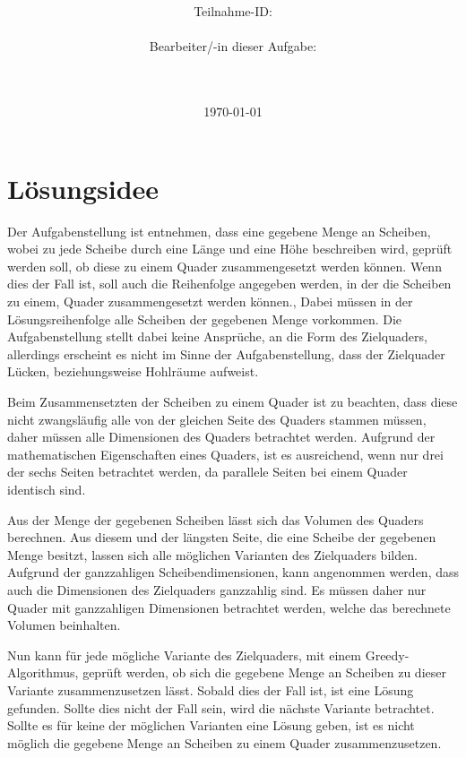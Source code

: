 \documentclass[a4paper,10pt,ngerman]{scrartcl}
\title{\textbf{\Huge\Aufgabe}}
\author{\LARGE Teilnahme-ID: \LARGE \TeilnahmeId \\\\
\LARGE Bearbeiter/-in dieser Aufgabe: \\
\LARGE \Name\\\\}
\date{\LARGE\today}
\begin{document}
    \maketitle
    \tableofcontents
    \vspace{0.5cm}

    \newpage
    \section{Lösungsidee}\label{sec:losungsidee}

    Der Aufgabenstellung ist entnehmen, dass eine gegebene Menge an Scheiben, wobei zu jede Scheibe durch
    eine Länge und eine Höhe beschreiben wird, geprüft werden soll, ob diese zu einem Quader zusammengesetzt werden können.
    Wenn dies der Fall ist, soll auch die Reihenfolge angegeben werden, in der die Scheiben zu einem, Quader zusammengesetzt werden können.,
    Dabei müssen in der Lösungsreihenfolge alle Scheiben der gegebenen Menge vorkommen.
    Die Aufgabenstellung stellt dabei keine Ansprüche, an die Form des Zielquaders, allerdings erscheint es nicht im Sinne der Aufgabenstellung,
    dass der Zielquader Lücken, beziehungsweise Hohlräume aufweist.

    Beim Zusammensetzten der Scheiben zu einem Quader ist zu beachten, dass diese nicht zwangsläufig alle von der gleichen Seite des Quaders stammen müssen,
    daher müssen alle Dimensionen des Quaders betrachtet werden.
    Aufgrund der mathematischen Eigenschaften eines Quaders, ist es ausreichend, wenn nur drei der sechs Seiten betrachtet werden,
    da parallele Seiten bei einem Quader identisch sind.

    Aus der Menge der gegebenen Scheiben lässt sich das Volumen des Quaders berechnen.
    Aus diesem und der längsten Seite, die eine Scheibe der gegebenen Menge besitzt, lassen sich alle möglichen Varianten des Zielquaders bilden.
    Aufgrund der ganzzahligen Scheibendimensionen, kann angenommen werden, dass auch die Dimensionen des Zielquaders ganzzahlig sind.
    Es müssen daher nur Quader mit ganzzahligen Dimensionen betrachtet werden, welche das berechnete Volumen beinhalten.

    Nun kann für jede mögliche Variante des Zielquaders, mit einem Greedy-Algorithmus, geprüft werden,
    ob sich die gegebene Menge an Scheiben zu dieser Variante zusammenzusetzen lässt.
    Sobald dies der Fall ist, ist eine Lösung gefunden.
    Sollte dies nicht der Fall sein, wird die nächste Variante betrachtet.
    Sollte es für keine der möglichen Varianten eine Lösung geben, ist es nicht möglich die gegebene Menge an Scheiben
    zu einem Quader zusammenzusetzen.
\end{document}

